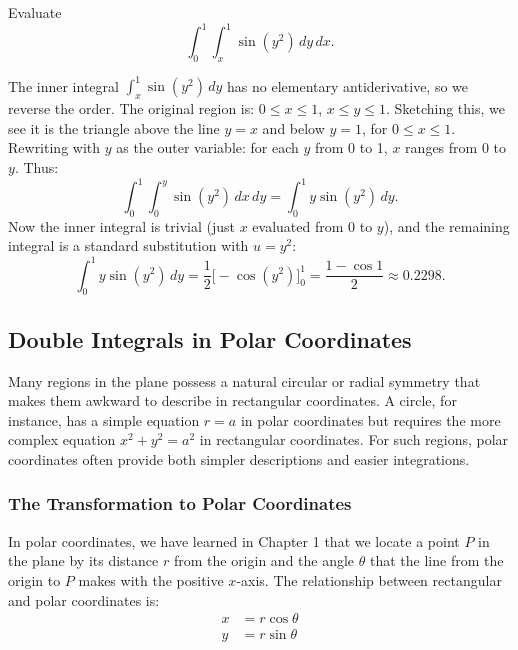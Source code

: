\exampleline
\begin{example}
Evaluate
\[
\int_0^1 \int_x^1 \sin(y^2) \, dy \, dx.
\]

\begin{solution}
The inner integral \( \int_x^1 \sin(y^2) \, dy \) has no elementary antiderivative, so we reverse the order. The original region is: \( 0 \leq x \leq 1 \), \( x \leq y \leq 1 \). Sketching this, we see it is the triangle above the line \( y = x \) and below \( y = 1 \), for \( 0 \leq x \leq 1 \). Rewriting with \( y \) as the outer variable: for each \( y \) from 0 to 1, \( x \) ranges from 0 to \( y \). Thus:
\[
\int_0^1 \int_0^y \sin(y^2) \, dx \, dy = \int_0^1 y \sin(y^2) \, dy.
\]
Now the inner integral is trivial (just \( x \) evaluated from 0 to \( y \)), and the remaining integral is a standard substitution with \( u = y^2 \):
\[
\int_0^1 y \sin(y^2) \, dy = \frac{1}{2}\bigl[-\cos(y^2)\bigr]_0^1 = \frac{1 - \cos 1}{2} \approx 0.2298.
\]
\end{solution}
\end{example}
\exampleline


\subsection*{Double Integrals in Polar Coordinates}  

\noindent Many regions in the plane possess a natural circular or radial symmetry that makes them awkward to describe in rectangular coordinates. A circle, for instance, has a simple equation $r = a$ in polar coordinates but requires the more complex equation $x^2 + y^2 = a^2$ in rectangular coordinates. For such regions, polar coordinates often provide both simpler descriptions and easier integrations.

\subsubsection*{The Transformation to Polar Coordinates}

\noindent In polar coordinates, we have learned in Chapter 1 that we locate a point $P$ in the plane by its distance $r$ from the origin and the angle $\theta$ that the line from the origin to $P$ makes with the positive $x$-axis. The relationship between rectangular and polar coordinates is:
\begin{align*}
x &= r\cos\theta \\
y &= r\sin\theta
\end{align*}

